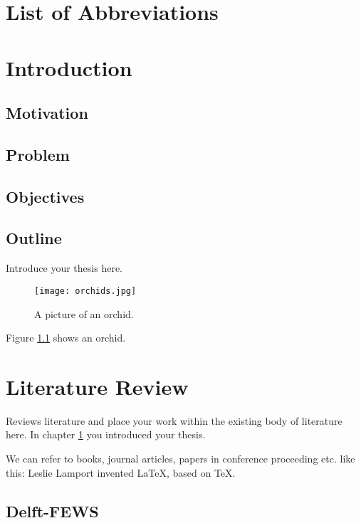 \documentclass[a4paper,oneside,12pt]{report}
\begin{document}
\chapter*{List of Abbreviations}


\chapter{Introduction}
\label{ch:intro}

\section{Motivation}

\section{Problem}

\section{Objectives}

\section{Outline}

Introduce your thesis here.
\begin{figure}
\begin{center}
  \texttt{[image: orchids.jpg]}\\
  \caption{A picture of an orchid.}\label{fi:orchid}
\end{center}
\end{figure}
Figure \ref{fi:orchid} shows an orchid.


\chapter{Literature Review}
\label{ch:literature}

Reviews literature and place your work within the existing body of literature here. In chapter \ref{ch:intro} you introduced your thesis.

We can refer to books, journal articles, papers in conference proceeding etc. like this: Leslie Lamport \cite{Akka.ioWhenCluster} invented \LaTeX, based on \TeX.

\section{Delft-FEWS}
\end{document}
